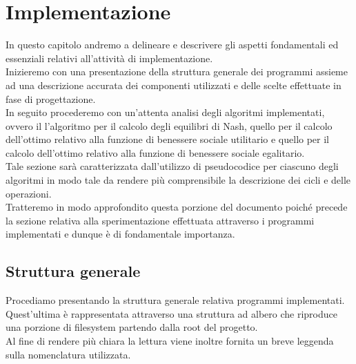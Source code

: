\chapter{Implementazione}

In questo capitolo andremo a delineare e descrivere gli aspetti fondamentali ed essenziali relativi all'attività di implementazione.\\

Inizieremo con una presentazione della struttura generale dei programmi assieme ad una descrizione accurata dei componenti utilizzati e delle scelte effettuate in fase di progettazione.\\

In seguito procederemo con un'attenta analisi degli algoritmi implementati, ovvero il l'algoritmo per il calcolo degli equilibri di Nash, quello per il calcolo dell'ottimo relativo alla funzione di benessere sociale utilitario e quello per il calcolo dell'ottimo relativo alla funzione di benessere sociale egalitario.\\
Tale sezione sarà caratterizzata dall'utilizzo di pseudocodice per ciascuno degli algoritmi in modo tale da rendere più comprensibile la descrizione dei cicli e delle operazioni.\\

Tratteremo in modo approfondito questa porzione del documento poiché precede la sezione relativa alla sperimentazione effettuata attraverso i programmi implementati e dunque è di fondamentale importanza.\\

\section{Struttura generale}
\justify

Procediamo presentando la struttura generale relativa programmi implementati.\\ 
Quest'ultima è rappresentata attraverso una struttura ad albero che riproduce una porzione di filesystem partendo dalla root del progetto.\\
Al fine di rendere più chiara la lettura viene inoltre fornita un breve leggenda sulla nomenclatura utilizzata.

